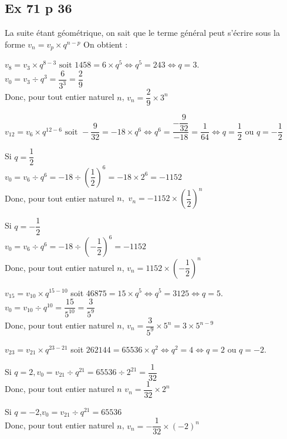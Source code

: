\documentclass[a4paper,french]{book}
\begin{document}
\subsection*{Ex 71 p 36}
La suite étant géométrique, on sait que le terme général peut s'écrire sous la forme $v_{n}=v_{p} \times q^{n-p}$ On obtient :
\begin{enumMet}
    \item $v_{8}=v_{3} \times q^{8-3} \text { soit } 1458=6 \times q^{5} \iff q^{5}=243 \iff q=3$.\\
    $v_{0}=v_{3} \div q^{3}=\dfrac{6}{3^{3}}=\dfrac{2}{9}$\\
    Donc, pour tout entier naturel $n$, $v_{n}=\dfrac{2}{9} \times 3^{n}$
    \item $v_{12}=v_{6} \times q^{12-6} \text { soit }-\dfrac{9}{32}=-18 \times q^{6} \iff q^{6}=\dfrac{-\dfrac{9}{32}}{-18}=\dfrac{1}{64} \iff q=\dfrac{1}{2} \text { ou } q=-\dfrac{1}{2}$\\
    \begin{itemMet}
        \item Si $q=\dfrac{1}{2}$\\
        $v_{0}=v_{6} \div q^{6}=-18 \div\left(\dfrac{1}{2}\right)^{6}=-18 \times 2^{6}=-1152$\\
        Donc, pour tout entier naturel $n,$
        $v_{n}=-1152 \times\left(\dfrac{1}{2}\right)^{n}$\\
        \item Si $q=-\dfrac{1}{2}$\\
        $v_{0}=v_{6} \div q^{6}=-18 \div\left(-\dfrac{1}{2}\right)^{6}=-1152$\\
        Donc, pour tout entier naturel $n$, $v_n=1152 \times\left(-\dfrac{1}{2}\right)^{n}$
    \end{itemMet}
    \item $v_{15}=v_{10} \times q^{15-10}$ soit $46875=15 \times q^{5} \iff q^{5}=3125 \iff q=5$.\\
    $v_{0}=v_{10} \div q^{10}=\dfrac{15}{5^{10}}=\dfrac{3}{5^{9}}$\\
    Donc, pour tout entier naturel $n$, $v_{n}=\dfrac{3}{5^{9}} \times 5^{n}=3 \times 5^{n-9}$
    \item $v_{23}=v_{21} \times q^{23-21}$ soit $262144=65536 \times q^{2} \iff q^{2}=4 \iff q=2$ ou $q=-2$.
    \begin{itemMet}
        \item Si $q=2, v_{0}=v_{21} \div q^{21}=65536 \div 2^{21}=\dfrac{1}{32}$\\
        Donc, pour tout entier naturel $n$ $v_{n}=\dfrac{1}{32} \times 2^{n}$
        \item Si $q=-2$,$v_{0}=v_{21} \div q^{21}=65536$\\
        Donc, pour tout entier naturel $n$, $v_{n}=-\dfrac{1}{32} \times(-2)^{n}$
    \end{itemMet}
\end{enumMet}
\end{document}
